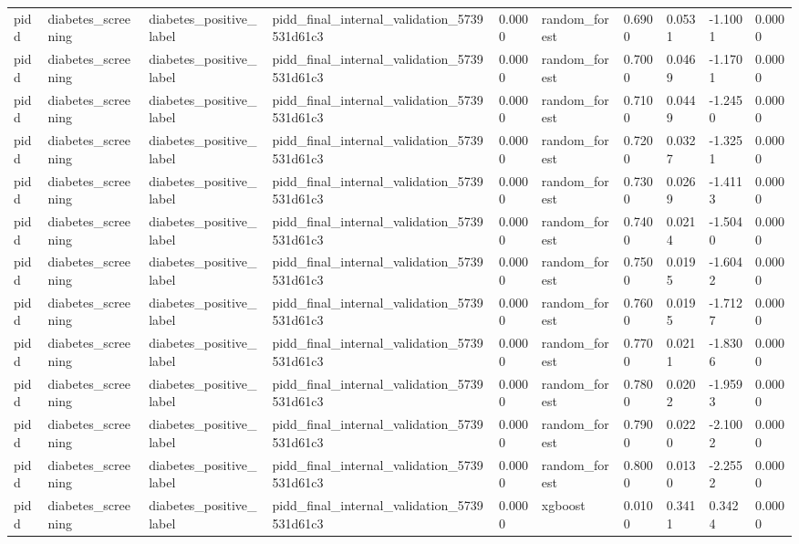 \begin{tabular}{llllllllll}
pidd & diabetes\_screening & diabetes\_positive\_label & pidd\_final\_internal\_validation\_5739531d61c3 & 0.0000 & random\_forest & 0.6900 & 0.0531 & -1.1001 & 0.0000 \\
pidd & diabetes\_screening & diabetes\_positive\_label & pidd\_final\_internal\_validation\_5739531d61c3 & 0.0000 & random\_forest & 0.7000 & 0.0469 & -1.1701 & 0.0000 \\
pidd & diabetes\_screening & diabetes\_positive\_label & pidd\_final\_internal\_validation\_5739531d61c3 & 0.0000 & random\_forest & 0.7100 & 0.0449 & -1.2450 & 0.0000 \\
pidd & diabetes\_screening & diabetes\_positive\_label & pidd\_final\_internal\_validation\_5739531d61c3 & 0.0000 & random\_forest & 0.7200 & 0.0327 & -1.3251 & 0.0000 \\
pidd & diabetes\_screening & diabetes\_positive\_label & pidd\_final\_internal\_validation\_5739531d61c3 & 0.0000 & random\_forest & 0.7300 & 0.0269 & -1.4113 & 0.0000 \\
pidd & diabetes\_screening & diabetes\_positive\_label & pidd\_final\_internal\_validation\_5739531d61c3 & 0.0000 & random\_forest & 0.7400 & 0.0214 & -1.5040 & 0.0000 \\
pidd & diabetes\_screening & diabetes\_positive\_label & pidd\_final\_internal\_validation\_5739531d61c3 & 0.0000 & random\_forest & 0.7500 & 0.0195 & -1.6042 & 0.0000 \\
pidd & diabetes\_screening & diabetes\_positive\_label & pidd\_final\_internal\_validation\_5739531d61c3 & 0.0000 & random\_forest & 0.7600 & 0.0195 & -1.7127 & 0.0000 \\
pidd & diabetes\_screening & diabetes\_positive\_label & pidd\_final\_internal\_validation\_5739531d61c3 & 0.0000 & random\_forest & 0.7700 & 0.0211 & -1.8306 & 0.0000 \\
pidd & diabetes\_screening & diabetes\_positive\_label & pidd\_final\_internal\_validation\_5739531d61c3 & 0.0000 & random\_forest & 0.7800 & 0.0202 & -1.9593 & 0.0000 \\
pidd & diabetes\_screening & diabetes\_positive\_label & pidd\_final\_internal\_validation\_5739531d61c3 & 0.0000 & random\_forest & 0.7900 & 0.0220 & -2.1002 & 0.0000 \\
pidd & diabetes\_screening & diabetes\_positive\_label & pidd\_final\_internal\_validation\_5739531d61c3 & 0.0000 & random\_forest & 0.8000 & 0.0130 & -2.2552 & 0.0000 \\
pidd & diabetes\_screening & diabetes\_positive\_label & pidd\_final\_internal\_validation\_5739531d61c3 & 0.0000 & xgboost & 0.0100 & 0.3411 & 0.3424 & 0.0000 \\

\end{tabular}
